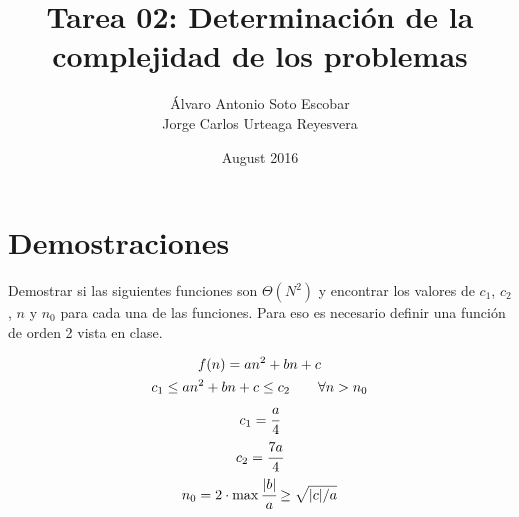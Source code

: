 \documentclass{article}
\title{Tarea 02: Determinación de la complejidad de los problemas}
\author{Álvaro Antonio Soto Escobar\\Jorge Carlos Urteaga Reyesvera }
\date{August 2016}
\begin{document}
\maketitle

\section{Demostraciones}
Demostrar si las siguientes funciones son $\Theta(N^2)$ y encontrar los valores de $c_1$, $c_2$, $n$ y $n_0$ para cada una de las funciones. Para eso es necesario definir una función de orden 2 vista en clase.

\begin{gather*} 
 f(n)=an^2+bn+c\\ 
 c_1 \leq an^2+bn+c\leq c_2 \quad \quad\forall n>n_0\\
 c_1 = \cfrac{a}{4}\\
 c_2= \cfrac{7a}{4}\\
 n_0 = 2\cdot\max{\cfrac{|b|}{a}\geq \sqrt{|c|/a }}
\end{gather*}
\end{document}
